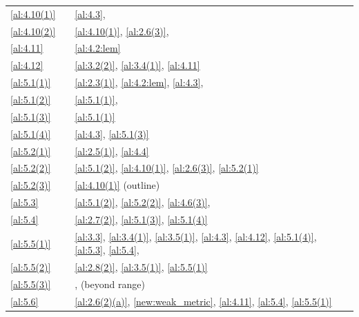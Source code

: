 \documentclass[a4paper,twoside,leqno]{article}
\begin{document}
\begin{center}
\begin{longtable}{p{}p{}p{}p{}}
\ref{al:4.10(1)} & \cite[4.10(1)]{Allard1972} & \ref{al:4.3}, \cite[2.4.9]{Federer1969} &  \\
\ref{al:4.10(2)} & \cite[4.10(2)]{Allard1972} & \ref{al:4.10(1)}, \ref{al:2.6(3)}, \cite[2.9.19, 2.9.20]{Federer1969} &  \\
\ref{al:4.11} & \cite[4.11]{Allard1972} & \ref{al:4.2:lem} &  \\
\ref{al:4.12} & \cite[4.12]{Allard1972} & \ref{al:3.2(2)}, \ref{al:3.4(1)}, \ref{al:4.11} &  \\
\ref{al:5.1(1)} & \cite[5.1(1)]{Allard1972} & \ref{al:2.3(1)}, \ref{al:4.2:lem}, \ref{al:4.3}, \cite[2.5.17, 4.1.4]{Federer1969} &  \\
\ref{al:5.1(2)} & \cite[5.1(2)]{Allard1972} & \ref{al:5.1(1)}, \cite[2.4.7]{Federer1969} &  \\
\ref{al:5.1(3)} & \cite[5.1(3)]{Allard1972} & \ref{al:5.1(1)} &  \\
\ref{al:5.1(4)} & \cite[5.1(4)]{Allard1972} & \ref{al:4.3}, \ref{al:5.1(3)} &  \\
\ref{al:5.2(1)} & \cite[5.2(1)]{Allard1972} & \ref{al:2.5(1)}, \ref{al:4.4} &  \\
\ref{al:5.2(2)} & \cite[5.2(2)]{Allard1972} & \ref{al:5.1(2)}, \ref{al:4.10(1)}, \ref{al:2.6(3)}, \ref{al:5.2(1)} &  \\
\ref{al:5.2(3)} & \cite[5.2(3)]{Allard1972} & \ref{al:4.10(1)} (outline) &  \\
\ref{al:5.3} & \cite[5.3]{Allard1972} & \ref{al:5.1(2)}, \ref{al:5.2(2)}, \ref{al:4.6(3)}, \cite[2.6.2]{Federer1969} &  \\
\ref{al:5.4} & \cite[5.4]{Allard1972} & \ref{al:2.7(2)}, \ref{al:5.1(3)}, \ref{al:5.1(4)} &  \\
\ref{al:5.5(1)} & \cite[5.5(1)]{Allard1972} & \ref{al:3.3}, \ref{al:3.4(1)}, \ref{al:3.5(1)}, \ref{al:4.3}, \ref{al:4.12}, \ref{al:5.1(4)}, \ref{al:5.3}, \ref{al:5.4}, \cite[2.8.18, 2.9.13, 3.2.16]{Federer1969} &  \\
\ref{al:5.5(2)} & \cite[5.5(2)]{Allard1972} & \ref{al:2.8(2)}, \ref{al:3.5(1)}, \ref{al:5.5(1)} &  \\
\ref{al:5.5(3)} & \cite[5.5(3)]{Allard1972} & \cite[4.1.25]{Federer1969}, \cite[4.2, 4.2.10]{Federer1969} (beyond range) &  \\
\ref{al:5.6} & \cite[5.6]{Allard1972} & \ref{al:2.6(2)(a)}, \ref{new:weak_metric}, \ref{al:4.11}, \ref{al:5.4}, \ref{al:5.5(1)} &  \\
\end{longtable}
\end{center}
\end{document}
